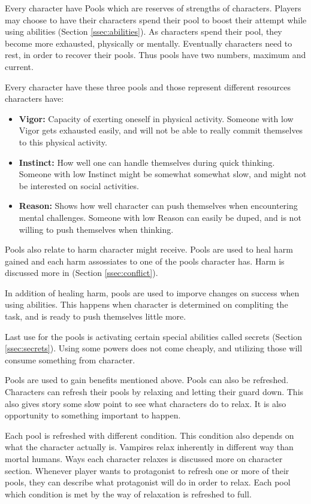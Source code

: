 Every character have Pools which are reserves of strengths of characters.
Players may choose to have their characters spend their pool to boost their attempt while using abilities (Section \ref{ssec:abilities}).
As characters spend their pool, they become more exhausted, physically or mentally.
Eventually characters need to rest, in order to recover their pools.
Thus pools have two numbers, maximum and current.

Every character have these three pools and those represent different resources characters have:
\begin{itemize}
\item{\textbf{Vigor: }Capacity of exerting oneself in physical activity. Someone with low Vigor gets exhausted easily, and will not be able to really commit themselves to this physical activity.}
\item{\textbf{Instinct: }How well one can handle themselves during quick thinking. Someone with low Instinct might be somewhat somewhat slow, and might not be interested on social activities.}
\item{\textbf{Reason: }Shows how well character can push themselves when encountering mental challenges. Someone with low Reason can easily be duped, and is not willing to push themselves when thinking.}
\end{itemize}

Pools also relate to harm character might receive.
Pools are used to heal harm gained and each harm assossiates to one of the pools character has.
Harm is discussed more in (Section \ref{ssec:conflict}).

In addition of healing harm, pools are used to imporve changes on success when using abilities.
This happens when character is determined on compliting the task, and is ready to push themselves little more.

Last use for the pools is activating certain special abilities called secrets (Section \ref{ssec:secrets}).
Using some powers does not come cheaply, and utilizing those will consume something from character.

Pools are used to gain benefits mentioned above.
Pools can also be refreshed.
Characters can refresh their pools by relaxing and letting their guard down.
This also gives story some slow point to see what characters do to relax.
It is also opportunity to something important to happen.

Each pool is refreshed with different condition.
This condition also depends on what the character actually is.
Vampires relax inherently in different way than mortal humans.
Ways each character relaxes is discussed more on character section.
Whenever player wants to protagonist to refresh one or more of their pools, they can describe what protagonist will do in order to relax.
Each pool which condition is met by the way of relaxation is refreshed to full.

\pagebreak
